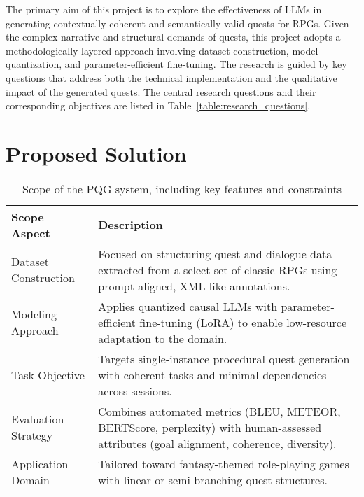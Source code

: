 The primary aim of this project is to explore the effectiveness of LLMs in generating contextually
coherent and semantically valid quests for RPGs. Given the complex narrative
and structural demands of quests, this project adopts a methodologically layered approach
involving dataset construction, model quantization, and parameter-efficient fine-tuning.
The research is guided by key questions that address both the technical implementation
and the qualitative impact of the generated quests. The central research questions and
their corresponding objectives are listed in Table~\ref{table:research_questions}.

\section{Proposed Solution}

\begin{table}[t]
  \centering
  \scriptsize
  \renewcommand{\arraystretch}{1.3}
  \begin{tabularx}{0.95\textwidth}{
    >{\raggedright\arraybackslash}p{5cm}
    >{\raggedright\arraybackslash}X
  }
    \toprule
    \textbf{Scope Aspect} & \textbf{Description} \\
    \midrule
    Dataset Construction
      & Focused on structuring quest and dialogue data extracted from a select set of classic RPGs using prompt-aligned, XML-like annotations. \\
    Modeling Approach
      & Applies quantized causal LLMs with parameter-efficient fine-tuning (LoRA) to enable low-resource adaptation to the domain. \\
    Task Objective
      & Targets single-instance procedural quest generation with coherent tasks and minimal dependencies across sessions. \\
    Evaluation Strategy
      & Combines automated metrics (BLEU, METEOR, BERTScore, perplexity) with human-assessed attributes (goal alignment, coherence, diversity). \\
    Application Domain
      & Tailored toward fantasy-themed role-playing games with linear or semi-branching quest structures. \\
    \bottomrule
  \end{tabularx}
  \caption{Scope of the PQG system, including key features and constraints}
  \label{table:scope}
\end{table}

